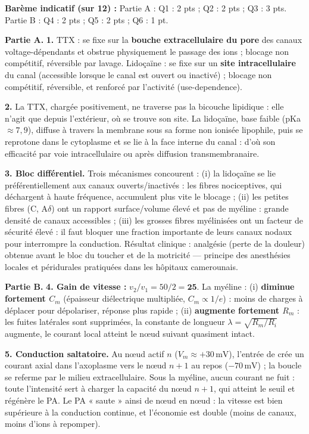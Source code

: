 \documentclass[11pt]{article}
\begin{document}
\begin{corrige}
\textbf{Barème indicatif (sur 12) :} Partie A : Q1 : 2 pts ; Q2 : 2 pts ; Q3 : 3 pts. Partie B : Q4 : 2 pts ; Q5 : 2 pts ; Q6 : 1 pt.

\textbf{Partie A.}
\textbf{1.} TTX : se fixe sur la \textbf{bouche extracellulaire du pore} des canaux  voltage-dépendants et obstrue physiquement le passage des ions ; blocage non compétitif, réversible par lavage. Lidoçaïne : se fixe sur un \textbf{site intracellulaire} du canal (accessible lorsque le canal est ouvert ou inactivé) ; blocage non compétitif, réversible, et renforcé par l'activité (use-dependence).

\textbf{2.} La TTX, chargée positivement, ne traverse pas la bicouche lipidique : elle n'agit que depuis l'extérieur, où se trouve son site. La lidoçaïne, base faible (pKa $\approx 7{,}9$), diffuse à travers la membrane sous sa forme non ionisée lipophile, puis se reprotone dans le cytoplasme et se lie à la face interne du canal : d'où son efficacité par voie intracellulaire ou après diffusion transmembranaire.

\textbf{3. Bloc différentiel.} Trois mécanismes concourent : (i) la lidoçaïne se lie préférentiellement aux canaux ouverts/inactivés : les fibres nociceptives, qui déchargent à haute fréquence, accumulent plus vite le blocage ; (ii) les petites fibres (C, A$\delta$) ont un rapport surface/volume élevé et pas de myéline : grande densité de canaux accessibles ; (iii) les grosses fibres myélinisées ont un facteur de sécurité élevé : il faut bloquer une fraction importante de leurs canaux nodaux pour interrompre la conduction. Résultat clinique : analgésie (perte de la douleur) obtenue avant le bloc du toucher et de la motricité — principe des anesthésies locales et péridurales pratiquées dans les hôpitaux camerounais.

\textbf{Partie B.}
\textbf{4. Gain de vitesse :} $v_2/v_1 = 50/2 = \mathbf{25}$. La myéline : (i) \textbf{diminue fortement $C_m$} (épaisseur diélectrique multipliée, $C_m \propto 1/e$) : moins de charges à déplacer pour dépolariser, réponse plus rapide ; (ii) \textbf{augmente fortement $R_m$} : les fuites latérales sont supprimées, la constante de longueur $\lambda = \sqrt{R_m/R_i}$ augmente, le courant local atteint le nœud suivant quasiment intact.

\textbf{5. Conduction saltatoire.} Au nœud actif $n$ ($V_m \approx +30\,\text{mV}$), l'entrée de  crée un courant axial dans l'axoplasme vers le nœud $n+1$ au repos ($-70\,\text{mV}$) ; la boucle se referme par le milieu extracellulaire. Sous la myéline, aucun courant ne fuit : toute l'intensité sert à charger la capacité du nœud $n+1$, qui atteint le seuil et régénère le PA. Le PA « saute » ainsi de nœud en nœud : la vitesse est bien supérieure à la conduction continue, et l'économie est double (moins de canaux, moins d'ions à repomper).


\end{corrige}
\end{document}
